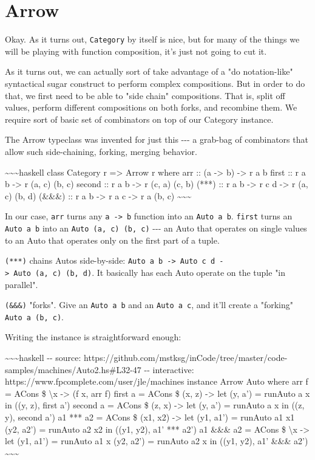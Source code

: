 \documentclass[]{article}
\begin{document}
\section{Arrow}

Okay. As it turns out, \texttt{Category} by itself is nice, but for many of the
things we will be playing with function composition, it's just not going to cut
it.

As it turns out, we can actually sort of take advantage of a "do notation-like"
syntactical sugar construct to perform complex compositions. But in order to do
that, we first need to be able to "side chain" compositions. That is, split off
values, perform different compositions on both forks, and recombine them. We
require sort of basic set of combinators on top of our Category instance.

The Arrow typeclass was invented for just this -\/-\/- a grab-bag of combinators
that allow such side-chaining, forking, merging behavior.

\textasciitilde{}\textasciitilde{}\textasciitilde{}haskell class Category r
=\textgreater{} Arrow r where arr :: (a -\textgreater{} b) -\textgreater{} r a b
first :: r a b -\textgreater{} r (a, c) (b, c) second :: r a b -\textgreater{} r
(c, a) (c, b) (***) :: r a b -\textgreater{} r c d -\textgreater{} r (a, c) (b,
d) (\&\&\&) :: r a b -\textgreater{} r a c -\textgreater{} r a (b, c)
\textasciitilde{}\textasciitilde{}\textasciitilde{}

In our case, \texttt{arr} turns any \texttt{a\ -\textgreater{}\ b} function into
an \texttt{Auto\ a\ b}. \texttt{first} turns an \texttt{Auto\ a\ b} into an
\texttt{Auto\ (a,\ c)\ (b,\ c)} -\/-\/- an Auto that operates on single values
to an Auto that operates only on the first part of a tuple.

\texttt{(***)} chains Autos side-by-side:
\texttt{Auto\ a\ b\ -\textgreater{}\ Auto\ c\ d\ -\textgreater{}\ Auto\ (a,\ c)\ (b,\ d)}.
It basically has each Auto operate on the tuple "in parallel".

\texttt{(\&\&\&)} "forks". Give an \texttt{Auto\ a\ b} and an
\texttt{Auto\ a\ c}, and it'll create a "forking" \texttt{Auto\ a\ (b,\ c)}.

Writing the instance is straightforward enough:

\textasciitilde{}\textasciitilde{}\textasciitilde{}haskell -\/- source:
https://github.com/mstksg/inCode/tree/master/code-samples/machines/Auto2.hs\#L32-47
-\/- interactive: https://www.fpcomplete.com/user/jle/machines instance Arrow
Auto where arr f = ACons \$ \textbackslash{}x -\textgreater{} (f x, arr f) first
a = ACons \$ (x, z) -\textgreater{} let (y, a') = runAuto a x in ((y, z), first
a') second a = ACons \$ (z, x) -\textgreater{} let (y, a') = runAuto a x in ((z,
y), second a') a1 *** a2 = ACons \$ (x1, x2) -\textgreater{} let (y1, a1') =
runAuto a1 x1 (y2, a2') = runAuto a2 x2 in ((y1, y2), a1' *** a2') a1 \&\&\& a2
= ACons \$ \textbackslash{}x -\textgreater{} let (y1, a1') = runAuto a1 x (y2,
a2') = runAuto a2 x in ((y1, y2), a1' \&\&\& a2')
\textasciitilde{}\textasciitilde{}\textasciitilde{}
\end{document}
